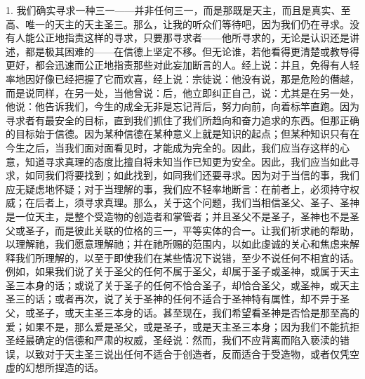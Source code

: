 1. 我们确实寻求一种三一——并非任何三一，而是那既是天主，而且是真实、至高、唯一的天主的天主圣三。那么，让我的听众们等待吧，因为我们仍在寻求。没有人能公正地指责这样的寻求，只要那寻求者——他所寻求的，无论是认识还是讲述，都是极其困难的——在信德上坚定不移。但无论谁，若他看得更清楚或教导得更好，都会迅速而公正地指责那些对此妄加断言的人。经上说：并且，免得有人轻率地因好像已经把握了它而欢喜，经上说：宗徒说：他没有说，那是危险的僭越，而是说同样，在另一处，当他曾说：后，他立即纠正自己，说：尤其是在另一处，他说：他告诉我们，今生的成全无非是忘记背后，努力向前，向着标竿直跑。因为寻求者有最安全的目标，直到我们抓住了我们所趋向和奋力追求的东西。但那正确的目标始于信德。因为某种信德在某种意义上就是知识的起点；但某种知识只有在今生之后，当我们面对面看见时，才能成为完全的。因此，我们应当存这样的心意，知道寻求真理的态度比擅自将未知当作已知更为安全。因此，我们应当如此寻求，如同我们将要找到；如此找到，如同我们还要寻求。因为对于当信的事，我们应无疑虑地怀疑；对于当理解的事，我们应不轻率地断言：在前者上，必须持守权威；在后者上，须寻求真理。那么，关于这个问题，我们当相信圣父、圣子、圣神是一位天主，是整个受造物的创造者和掌管者；并且圣父不是圣子，圣神也不是圣父或圣子，而是彼此关联的位格的三一，平等实体的合一。让我们祈求祂的帮助，以理解祂，我们愿意理解祂；并在祂所赐的范围内，以如此虔诚的关心和焦虑来解释我们所理解的，以至于即使我们在某些情况下说错，至少不说任何不相宜的话。例如，如果我们说了关于圣父的任何不属于圣父，却属于圣子或圣神，或属于天主圣三本身的话；或说了关于圣子的任何不恰合圣子，却恰合圣父，或圣神，或天主圣三的话；或者再次，说了关于圣神的任何不适合于圣神特有属性，却不异于圣父，或圣子，或天主圣三本身的话。甚至现在，我们希望看圣神是否恰是那至高的爱；如果不是，那么爱是圣父，或是圣子，或是天主圣三本身；因为我们不能抗拒圣经最确定的信德和严肃的权威，圣经说：然而，我们不应背离而陷入亵渎的错误，以致对于天主圣三说出任何不适合于创造者，反而适合于受造物，或者仅凭空虚的幻想所捏造的话。\par


